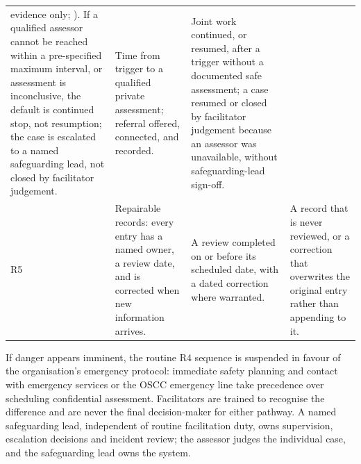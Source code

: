 \begin{table}[t]
\begin{tabularx}{\textwidth}{@{}p{0.9cm}YYY@{}}
evidence only; \cite{ref158,ref159,ref162,ref163}). If a qualified assessor cannot be reached
within a pre-specified maximum interval, or assessment is inconclusive, the default is continued
stop, not resumption; the case is escalated to a named safeguarding lead, not closed by facilitator
judgement. & Time from trigger to a qualified private assessment; referral
offered, connected, and recorded. & Joint work continued, or resumed, after a trigger without
a documented safe assessment; a case resumed or closed by facilitator judgement because an assessor
was unavailable, without safeguarding-lead sign-off.\\
R5 & Repairable records: every entry has a named owner, a review date, and is corrected when new
information arrives. & A review completed on or before its scheduled date, with a dated correction
where warranted. & A record that is never reviewed, or a correction that overwrites the original
entry rather than appending to it.\\
\bottomrule
\end{tabularx}
\end{table}

If danger appears imminent, the routine R4 sequence is suspended in favour of the organisation's
emergency protocol: immediate safety planning and contact with emergency services or the OSCC
emergency line take precedence over scheduling confidential assessment. Facilitators are trained to
recognise the difference and are never the final decision-maker for either pathway. A named
safeguarding lead, independent of routine facilitation duty, owns supervision, escalation decisions
and incident review; the assessor judges the individual case, and the safeguarding lead owns the
system.

